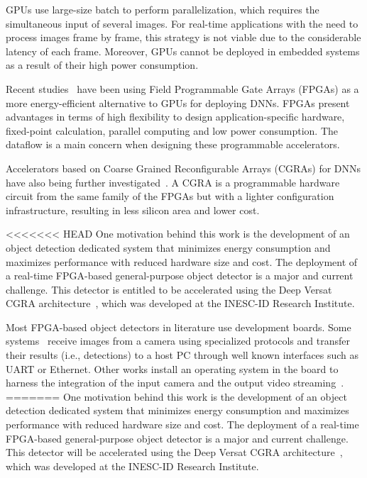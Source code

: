 GPUs use large-size batch to perform parallelization, which requires the simultaneous input of several images. For real-time applications with the need to process images frame by frame, this strategy is not viable due to the considerable latency of each frame. Moreover, GPUs cannot be deployed in embedded systems as a result of their high power consumption.

Recent studies~\citep{ma:loop_opt, sze:dnn_survey, Abdelouahab:dnn_survey, Guo:dnn_survey} have been using Field Programmable Gate Arrays (FPGAs) as a more energy-efficient alternative to GPUs for deploying DNNs. FPGAs present advantages in terms of high flexibility to design application-specific hardware, fixed-point calculation, parallel computing and low power consumption. The dataflow is a main concern when designing these programmable accelerators.

Accelerators based on Coarse Grained Reconfigurable Arrays (CGRAs) for DNNs have also being further investigated~\citep{auto_tuning_cgra, alexnet_cgra}. A CGRA is a programmable hardware circuit from the same family of the FPGAs but with a lighter configuration infrastructure, resulting in less silicon area and lower cost.  

<<<<<<< HEAD
One motivation behind this work is the development of an object detection dedicated system that minimizes energy consumption and maximizes performance with reduced hardware size and cost. The deployment of a real-time FPGA-based general-purpose object detector is a major and current challenge. This detector is entitled to be accelerated using the Deep Versat CGRA architecture~\cite{valter:deep_versat}, which was developed at the INESC-ID Research Institute.

Most FPGA-based object detectors in literature use development boards. Some systems~\citep{long:fpga_demo, bochem:fpga_demo} receive images from a camera using specialized protocols and transfer their results (i.e., detections) to a host PC through well known interfaces such as UART or Ethernet. Other works install an operating system in the board to harness the integration of the input camera and the output video streaming~\cite{llorente:fpga_demo}.
=======
One motivation behind this work is the development of an object detection dedicated system that minimizes energy consumption and maximizes performance with reduced hardware size and cost. The deployment of a real-time FPGA-based general-purpose object detector is a major and current challenge. This detector will be accelerated using the Deep Versat CGRA architecture~\cite{valter:deep_versat}, which was developed at the INESC-ID Research Institute.

